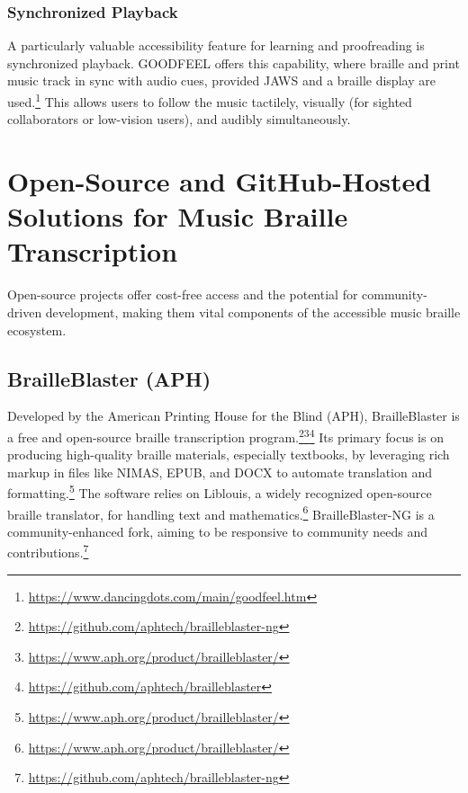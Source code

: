 \subsubsection{Synchronized Playback}
A particularly valuable accessibility feature for learning and proofreading is synchronized playback. GOODFEEL offers this capability, where braille and print music track in sync with audio cues, provided JAWS and a braille display are used.\footnote{\url{https://www.dancingdots.com/main/goodfeel.htm}} This allows users to follow the music tactilely, visually (for sighted collaborators or low-vision users), and audibly simultaneously.

\section{Open-Source and GitHub-Hosted Solutions for Music Braille Transcription}

Open-source projects offer cost-free access and the potential for community-driven development, making them vital components of the accessible music braille ecosystem.

\subsection{BrailleBlaster (APH)}
Developed by the American Printing House for the Blind (APH), BrailleBlaster is a free and open-source braille transcription program.\footnote{\url{https://github.com/aphtech/brailleblaster-ng}}\footnote{\url{https://www.aph.org/product/brailleblaster/}}\footnote{\url{https://github.com/aphtech/brailleblaster}} Its primary focus is on producing high-quality braille materials, especially textbooks, by leveraging rich markup in files like NIMAS, EPUB, and DOCX to automate translation and formatting.\footnote{\url{https://www.aph.org/product/brailleblaster/}} The software relies on Liblouis, a widely recognized open-source braille translator, for handling text and mathematics.\footnote{\url{https://www.aph.org/product/brailleblaster/}} BrailleBlaster-NG is a community-enhanced fork, aiming to be responsive to community needs and contributions.\footnote{\url{https://github.com/aphtech/brailleblaster-ng}}

